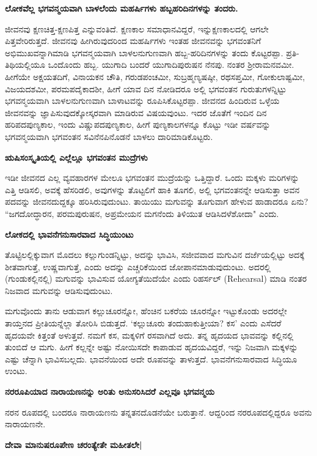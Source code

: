 {\bf ಲೋಕವೆಲ್ಲ ಭಗವನ್ಮಯವಾಗಿ ಬಾಳಲೆಂದು ಮಹರ್ಷಿಗಳು ಹಬ್ಬಹರಿದಿನಗಳನ್ನು ತಂದರು.} 


ಜೀವನವು ಕ್ಷಣಚಿತ್ತ-ಕ್ಷಣಪಿತ್ತ ಎನ್ನುವಂತಿದೆ. ಕ್ಷಣಕಾಲ ಸಮಾಧಾನವಿದ್ದರೆ, ಇನ್ನುಕ್ಷಣಕಾಲದಲ್ಲಿ ಆಗಲೇ ಪಿತ್ತವೇರಿರುತ್ತದೆ. ಜೀವನವು ಹೀಗಿರುವುದರಿಂದ ಮಹರ್ಷಿಗಳು ಇಂತಹ ಜೀವನವನ್ನು ಭಗವಂತನಿಗೆ ಅಭಿಮುಖವನ್ನಾಗಿಮಾಡಿ ಭಗವನ್ಮಯವಾಗಿ ಬಾಳಲನುಗುಣವಾಗಿ ಹಬ್ಬ-ಹರಿದಿನಗಳನ್ನು ತಂದು ಕೊಟ್ಟರಪ್ಪಾ. ಪ್ರತಿ-ತಿಥಿಯಲ್ಲಿಯೂ ಒಂದೊಂದು ಹಬ್ಬ. ಯುಗಾದಿ ಬಂದರೆ ಯುಗಾದಿಪುರುಷನ ನೆನಪು. ನಂತರ ಶ್ರೀರಾಮನವಮೀ. ಹೀಗೆಯೇ ಅಕ್ಷಯತದಿಗೆ, ವಿನಾಯಕನ ಚೌತಿ, ಗರುಡಪಂಚಮೀ, ಸುಬ್ರಹ್ಮಣ್ಯಷಷ್ಠೀ, ರಥಸಪ್ತಮೀ, ಗೋಕುಲಾಷ್ಟಮೀ, ವಿಜಯದಶಮೀ, ಪರಮಪದೈಕಾದಶೀ, ಹೀಗೆ ಯಾವ ದಿನ ನೋಡಿದರೂ ಅಲ್ಲಿ ಭಗವಂತನ ಗುರುತುಗಳನ್ನಿಟ್ಟು ಭಗವನ್ಮಯವಾಗಿ ಬಾಳಲನುಗುಣವಾಗಿ ಬಾಳಾಟವನ್ನು ರೂಪಿಸಿಕೊಟ್ಟರಪ್ಪಾ. ಜೀವನದ ಹಿಂದಿರುವ ಒಳ್ಳೆಯ ಜೀವನವನ್ನು ಜ್ಞಾಪಿಸುವುದಕ್ಕೋಸ್ಕರವಾಗಿ ಮಾಡಿರುವ ವಿಷಯವುಂಟು. ಇದರ ಜೊತೆಗೆ ಇಂದಿನ ದಿನ ಹರಿಪದಪುಣ್ಯಕಾಲ, ಇಂದು ವಿಷ್ಣುಪದಪುಣ್ಯಕಾಲ, ಹೀಗೆ ಪುಣ್ಯಕಾಲಗಳನ್ನೂ ಕೊಟ್ಟು ಇಡೀ ವರ್ಷವನ್ನು ಭಗವನ್ಮಯವಾಗಿ ಭಗವಂತನ ಸವಿನೆನಪಿನೊಡನೆ ಬಾಳಲು ದಾರಿಮಾಡಿಕೊಟ್ಟರು. 


\large{\bf{ಋಷಿಸಂಸ್ಕೃತಿಯಲ್ಲಿ ಎಲ್ಲೆಲ್ಲೂ ಭಗವಂತನ ಮುದ್ರೆಗಳು}} 


ಇಡೀ ಜೀವನದ ಎಲ್ಲ ವ್ಯವಹಾರಗಳ ಮೇಲೂ ಭಗವಂತನ ಮುದ್ರೆಯನ್ನು ಒತ್ತಿದ್ದಾರೆ. ಒಂದು ಮಕ್ಕಳು ಮರಿಗಳನ್ನು ಎತ್ತಿ ಆಡಿಸಲಿ, ಅವಕ್ಕೆ ಹೆಸರಿಡಲಿ, ಅವುಗಳನ್ನು ತೊಟ್ಟಲಿಗೆ ಹಾಕಿ ತೂಗಲಿ, ಅಲ್ಲಿ ಭಗವಂತನನ್ನೇ ಆಡಿಸುತ್ತಾ ಅವನ ಪದವನ್ನು ಜೀವನದುದ್ದಕ್ಕೂ ಹರಿಸಿರುವುದುಂಟು. ತಾಯಿಯು ಮಗುವನ್ನು ತೂಗುವಾಗ ಹೇಳುವ ಹಾಡಾದರೂ ಏನು? ``ಜಗದೋದ್ಧಾರನ, ಪರಮಪುರುಷನ, ಅಪ್ರಮೇಯನ ಮಗನೆಂದು ತಿಳಿಯುತ ಆಡಿಸಿದಳೆಶೋದಾ" ಎಂದು. 


\large{\bf{ಲೋಕದಲ್ಲಿ ಭಾವನೆಗನುಸಾರವಾದ ಸಿದ್ಧಿಯುಂಟು}} 


ತೊಟ್ಟಿಲಲ್ಲಿಕ್ಕುವಾಗ ಮೊದಲು ಕಲ್ಲುಗುಂಡನ್ನಿಟ್ಟು, ಅದನ್ನು ಭಾವಿಸಿ, ಸಜೀವವಾದ ಮಗುವಿನ ದರ್ಜೆಯಲ್ಲಿಟ್ಟು ಅದಕ್ಕೆ ಶೀತವಾಗುತ್ತೆ, ಉಷ್ಣವಾಗುತ್ತೆ, ಎಂದು ಅದನ್ನು ಎಚ್ಚರಿಕೆಯಿಂದ ಜೋಪಾನಮಾಡುವುದುಂಟು. ಅದರಲ್ಲಿ (ಗುಂಡುಕಲ್ಲಿನಲ್ಲಿ) ಮಗುವನ್ನು ಭಾವಿಸುವ ಯೋಗ್ಯತೆಯಿದೆಯೇ ಎಂದು ರಿಹರ್ಸಲ್‍ {\rm{(Rehearsal)}} ಮಾಡಿ ನಂತರ ನಿಜವಾದ ಮಗುವನ್ನು ಆಡಿಸುವುದುಂಟು. 


ಮಗುವೊಂದು ತಾನು ಆಡುವಾಗ ಕಲ್ಲುಚೂರನ್ನೋ, ಹೆಂಚಿನ ಬಕರೆಯ ಚೂರನ್ನೋ ಇಟ್ಟುಕೊಂಡು ಅದರಲ್ಲೇ ತಾಯ್ತನದ ಪ್ರೀತಿಯನ್ನೆಲ್ಲಾ ತೋರಿಸಿ ಬಿಡುತ್ತದೆ. `ಕಲ್ಲುಚೂರು ತಂದುಹಾಕುತ್ತೀಯಾ? ಕಸ' ಎಂದು ಎಸೆದರೆ ಹೃದಯವೇ ಕಿತ್ತಂತೆ ಅಳುತ್ತವೆ. ನಮಗೆ ಕಸ, ಮಕ್ಕಳಿಗೆ ರಸವಾಗಿದೆ ಅದು. ತನ್ನ ಹೃದಯದ ಭಾವವನ್ನು ಕಲ್ಲಿನಲ್ಲಿ ತುಂಬಿದೆ ಆ ಮಗು. ಹೀಗೆ ಕಲ್ಲನ್ನೇ ಅಷ್ಟು ನೋಯಿಸದೇ ಕಾಪಾಡುವ ಹೃದಯವಿದ್ದರೆ, ಇನ್ನು ನಿಜವಾಗಿ ಮಕ್ಕಳನ್ನು ಎಷ್ಟು ಚೆನ್ನಾಗಿ ಭಾವಿಸಬಲ್ಲದು. ಭಾವನೆಯಿಂದ ಅದೇ ರೂಪವನ್ನು ತಾಳುತ್ತದೆ. ಭಾವನೆಗನುಸಾರವಾದ ಸಿದ್ಧಿಯೂ ಉಂಟು. 


{\bf ನರರೂಪಿಯಾದ ನಾರಾಯಣನನ್ನು ಅರಿತು ಅನುಸರಿಸಿದರೆ ಎಲ್ಲವೂ ಭಗವನ್ಮಯ} 


ನರನ ರೂಪದಲ್ಲಿ ಬಂದರೂ ನಾರಾಯಣನು ತನ್ನತನದೊಡನೆಯೇ ಬರುತ್ತಾನೆ. ಆದ್ದರಿಂದ ನರರೂಪದಲ್ಲಿದ್ದರೂ ಅವನು ನಾರಾಯಣನೇ. 


\begin{center} 

{\bf ದೇವಾ ಮಾನುಷರೂಪೇಣ ಚರಂತ್ಯೇತೇ ಮಹೀತಲೇ|} 

\end{center} 


